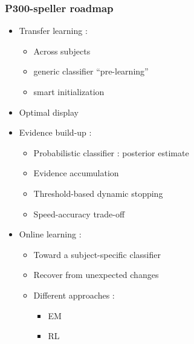 \documentclass{beamer}
\begin{document}
\begin{frame}\frametitle{P300-speller roadmap}
	\begin{itemize}
		\item Transfer learning \footnotesize{\cite{Kindermans12b, Congedo13}}: 
		\begin{itemize}
			\item Across subjects 
			\item generic classifier ``pre-learning''
			\item smart initialization
		\end{itemize}
		\item Optimal display
		\item Evidence build-up \footnotesize{\cite{Perrin12,Kindermans2013}}:
		\begin{itemize}
			\item Probabilistic classifier : posterior estimate
			\item Evidence accumulation
			\item Threshold-based dynamic stopping
			\item Speed-accuracy trade-off
		\end{itemize}
		\item Online learning : 
		\begin{itemize}
			\item Toward a subject-specific classifier
			\item Recover from unexpected changes
			\item Different approaches :
			\begin{itemize}
				\item EM \footnotesize{\cite{Li06,Kindermans12}}
				\item RL \footnotesize{\cite{Dauce2013}}
			\end{itemize}
		\end{itemize}  
	\end{itemize}
	
\end{frame}
%
\end{document}
